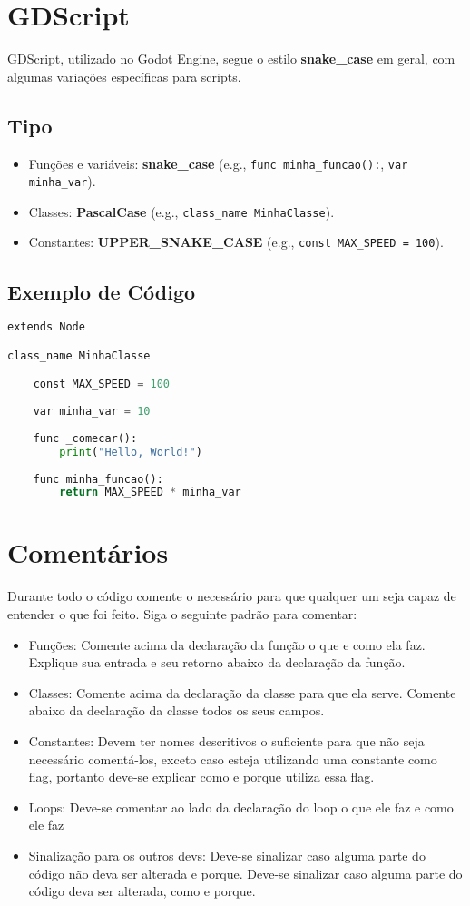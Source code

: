 \documentclass[12pt,a4paper]{article}
\begin{document}
\section{GDScript}
GDScript, utilizado no Godot Engine, segue o estilo \textbf{snake\_case} em geral, com algumas variações específicas para scripts.
\subsection*{Tipo}
\begin{itemize}
    \item Funções e variáveis: \textbf{snake\_case} (e.g., \lstinline|func minha_funcao():|, \lstinline|var minha_var|).
    \item Classes: \textbf{PascalCase} (e.g., \lstinline|class_name MinhaClasse|).
    \item Constantes: \textbf{UPPER\_SNAKE\_CASE} (e.g., \lstinline|const MAX_SPEED = 100|).
\end{itemize}

\subsection*{Exemplo de Código}
\begin{lstlisting}[language=Python]
extends Node

class_name MinhaClasse

    const MAX_SPEED = 100
    
    var minha_var = 10
    
    func _comecar():
        print("Hello, World!")
    
    func minha_funcao():
        return MAX_SPEED * minha_var
\end{lstlisting}

\section{Comentários}
Durante todo o código comente o necessário para que qualquer um seja capaz de entender o que foi feito. Siga o seguinte padrão para comentar: 
\begin{itemize}
    \item Funções: Comente acima da declaração da função o que e como ela faz. Explique sua entrada e seu retorno abaixo da declaração da função.
    \item Classes: Comente acima da declaração da classe para que ela serve. Comente abaixo da declaração da classe todos os seus campos.
    \item Constantes: Devem ter nomes descritivos o suficiente para que não seja necessário comentá-los, exceto caso esteja utilizando uma constante como flag, portanto deve-se explicar como e porque utiliza essa flag.
    \item Loops: Deve-se comentar ao lado da declaração do loop o que ele faz e como ele faz
    \item Sinalização para os outros devs: Deve-se sinalizar caso alguma parte do código não deva ser alterada e porque. Deve-se sinalizar caso alguma parte do código deva ser alterada, como e porque.
\end{itemize}
\end{document}
